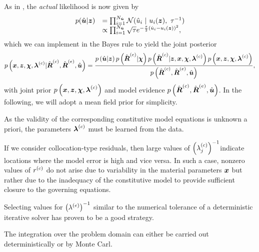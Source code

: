 As in \cite{scholz2025weak}, the \textit{actual} likelihood is now given by
\begin{equation}
    \begin{array}{ll}
p(\hat{\boldsymbol{u}}|\boldsymbol{z})  & =\prod_{i=1}^{N_{\hat{\boldsymbol{u}}}} \mathcal{N} (\hat{ u}_i~|~ u_i( \boldsymbol{z}), ~\tau^{-1}) \\
& \propto \prod_{i=1}^{N_{\hat{\boldsymbol{u}}}} \sqrt{ \tau}  e^{-\frac{\tau}{2} (\hat{ u}_i-u_i( \boldsymbol{z}))^2},
\end{array}
\label{actual_like}
\end{equation}
which we can implement in the Bayes rule to yield the joint posterior
\begin{equation}
    p\left( \boldsymbol{x}, \boldsymbol{z}, \boldsymbol{\chi}, \boldsymbol{\lambda}^{(c)} | \hat{\boldsymbol{R}}^{(c)}, \hat{\boldsymbol{R}}^{(e)}, \hat{\boldsymbol{u}} \right) = \frac{p \left( \hat{\boldsymbol{u}}|\boldsymbol{z} \right) p\left(\hat{\boldsymbol{R}}^{(e)} | \boldsymbol{\chi}\right) p\left( \hat{\boldsymbol{R}}^{(c)} | \boldsymbol{z},\boldsymbol{x}, \boldsymbol{\chi}, \boldsymbol{\lambda}^{(c)}\right) p\left( \boldsymbol{x}, \boldsymbol{z}, \boldsymbol{\chi}, \boldsymbol{\lambda}^{(c)}\right) }{p \left( \hat{\boldsymbol{R}}^{(c)}, \hat{\boldsymbol{R}}^{(e)}, \hat{\boldsymbol{u}} \right) },
\end{equation}
with joint prior $p\left( \boldsymbol{x}, \boldsymbol{z}, \boldsymbol{\chi}, \boldsymbol{\lambda}^{(c)}\right)$ and model evidence $p \left( \hat{\boldsymbol{R}}^{(c)}, \hat{\boldsymbol{R}}^{(e)}, \hat{\boldsymbol{u}} \right)$. In the following, we will adopt a mean field prior for simplicity.

\begin{Remarks}
    \item As the validity of the corresponding constitutive model equations is unknown a priori, the parameters $\boldsymbol{\lambda}^{(c)}$ must be learned from the data.
    \item If we consider collocation-type residuals, then large values of $\left(\lambda^{(c)}_j\right)^{-1}$indicate locations where the model error is high and vice versa. In such a case, nonzero values of $r^{(c)}$ do not arise due to variability in the material parameters $\boldsymbol{x}$ but rather due to the inadequacy of the constitutive model to provide sufficient closure to  the governing equations.
    \item Selecting values for $\left( \lambda^{(e)} \right)^{-1}$ similar to the numerical tolerance of a deterministic iterative solver has proven to be a good strategy.
    \item The integration over the problem domain can either be carried out deterministically or by Monte Carl.
\end{Remarks}

